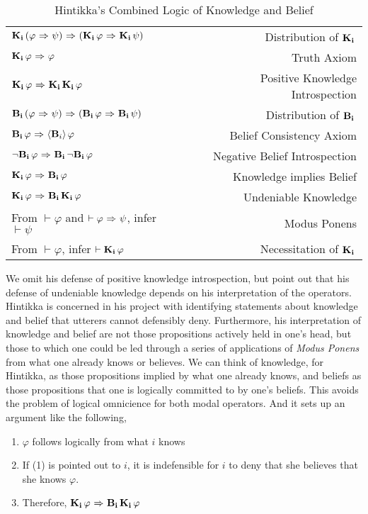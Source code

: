 \begin{table}[H]
	\begin{center}
		\begin{tabular}{| l r |}
			\hline
			$\mathbf{K}_{\mathbf{i}}\,(\varphi {\ \Rightarrow \ } \psi) {\ \Rightarrow \ } (\mathbf{K}_{\mathbf{i}}\,\varphi {\ \Rightarrow \ } \mathbf{K}_{\mathbf{i}}\,\psi)$ & Distribution of $\mathbf{K}_{\mathbf{i}}\,$ \\
			$\mathbf{K}_{\mathbf{i}}\,\varphi {\ \Rightarrow \ } \varphi$ & Truth Axiom \\
			$\mathbf{K}_{\mathbf{i}}\,\varphi {\ \Rightarrow \ } \mathbf{K}_{\mathbf{i}}\,\mathbf{K}_{\mathbf{i}}\,\varphi$ & Positive Knowledge Introspection\\
			$\mathbf{B}_{\mathbf{i}}\,(\varphi {\ \Rightarrow \ } \psi) {\ \Rightarrow \ } (\mathbf{B}_{\mathbf{i}}\,\varphi {\ \Rightarrow \ } \mathbf{B}_{\mathbf{i}}\,\psi)$ & Distribution of $\mathbf{B}_{\mathbf{i}}\,$\\
			$\mathbf{B}_{\mathbf{i}}\,\varphi {\ \Rightarrow \ } \langle \mathbf{B}_{i} \rangle\,\varphi$ & Belief Consistency Axiom\\
			${\neg}\mathbf{B}_{\mathbf{i}}\,\varphi {\ \Rightarrow \ } \mathbf{B}_{\mathbf{i}}\,{\neg}\mathbf{B}_{\mathbf{i}}\,\varphi$ & Negative Belief Introspection\\
			$\mathbf{K}_{\mathbf{i}}\,\varphi {\ \Rightarrow \ } \mathbf{B}_{\mathbf{i}}\,\varphi$ & Knowledge implies Belief \\
			$\mathbf{K}_{\mathbf{i}}\,\varphi {\ \Rightarrow \ } \mathbf{B}_{\mathbf{i}}\,\mathbf{K}_{\mathbf{i}}\,\varphi$ & Undeniable Knowledge\\
			From $\vdash \varphi$ and $\vdash \varphi {\ \Rightarrow \ } \psi$, infer $\vdash\psi$ & Modus Ponens\\
			From $\vdash \varphi$, infer $\vdash \mathbf{K}_{\mathbf{i}}\,\varphi$ & Necessitation of $\mathbf{K}_{\mathbf{i}}\,$\\
			\hline
		\end{tabular}
		\caption{Hintikka's Combined Logic of Knowledge and Belief}
	\end{center}
\end{table}

We omit his defense of positive knowledge introspection, but point out that his defense of undeniable knowledge depends on his interpretation of the operators. Hintikka is concerned in his project with identifying statements about knowledge and belief that utterers cannot defensibly deny. Furthermore, his interpretation of knowledge and belief are not those propositions actively held in one's head, but those to which one could be led through a series of applications of \emph{Modus Ponens} from what one already knows or believes. We can think of knowledge, for Hintikka, as those propositions implied by what one already knows, and beliefs as those propositions that one is logically committed to by one's beliefs. This avoids the problem of logical omnicience for both modal operators. And it sets up an argument like the following, 
\begin{enumerate}
	\item $\varphi$ follows logically from what $i$ knows
	\item If (1) is pointed out to $i$, it is indefensible for $i$ to deny that she believes that she knows $\varphi$.
	\item Therefore, $\mathbf{K}_{\mathbf{i}}\,\varphi {\ \Rightarrow \ } \mathbf{B}_{\mathbf{i}}\,\mathbf{K}_{\mathbf{i}}\,\varphi$
\end{enumerate}


